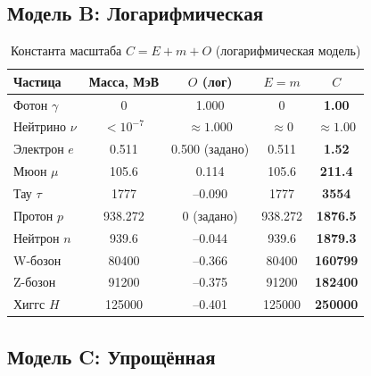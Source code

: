 \documentclass[12pt,a4paper]{article}
\begin{document}
\subsection{Модель B: Логарифмическая}

\begin{table}[h]
    \centering
    \caption{Константа масштаба $C = E + m + O$ (логарифмическая модель)}
    \begin{tabular}{lcccc}
        \toprule
        Частица & Масса, МэВ & $O$ (лог) & $E=m$ & $C$ \\
        \midrule
        Фотон $\gamma$ & 0 & 1.000 & 0 & \textbf{1.00} \\
        Нейтрино $\nu$ & $<10^{-7}$ & $\approx 1.000$ & $\approx 0$ & $\approx 1.00$ \\
        Электрон $e$ & 0.511 & 0.500 (задано) & 0.511 & \textbf{1.52} \\
        Мюон $\mu$ & 105.6 & 0.114 & 105.6 & \textbf{211.4} \\
        Тау $\tau$ & 1777 & --0.090 & 1777 & \textbf{3554} \\
        Протон $p$ & 938.272 & 0 (задано) & 938.272 & \textbf{1876.5} \\
        Нейтрон $n$ & 939.6 & --0.044 & 939.6 & \textbf{1879.3} \\
        W-бозон & 80400 & --0.366 & 80400 & \textbf{160799} \\
        Z-бозон & 91200 & --0.375 & 91200 & \textbf{182400} \\
        Хиггс $H$ & 125000 & --0.401 & 125000 & \textbf{250000} \\
        \bottomrule
    \end{tabular}
    \label{tab:modelB}
\end{table}

\subsection{Модель C: Упрощённая}
\end{document}
